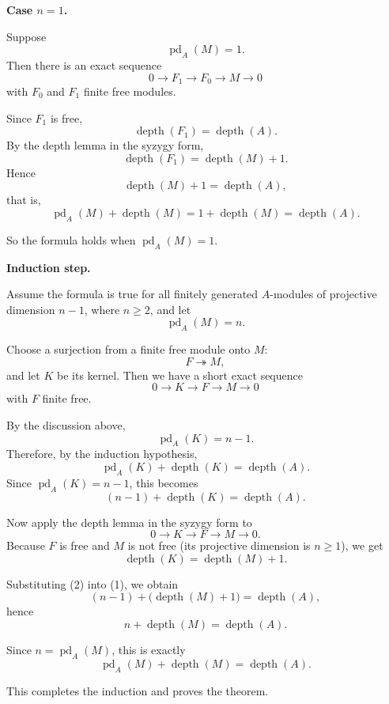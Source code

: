 \documentclass[12pt,a4paper]{article}
\theoremstyle{notespace}
\begin{document}
\medskip

\textbf{Case \(n=1\).}

Suppose
\[
\operatorname{pd}_A(M)=1.
\]
Then there is an exact sequence
\[
0 \longrightarrow F_1 \longrightarrow F_0 \longrightarrow M \longrightarrow 0
\]
with \(F_0\) and \(F_1\) finite free modules.

Since \(F_1\) is free,
\[
\operatorname{depth}(F_1)=\operatorname{depth}(A).
\]
By the depth lemma in the syzygy form,
\[
\operatorname{depth}(F_1)=\operatorname{depth}(M)+1.
\]
Hence
\[
\operatorname{depth}(M)+1=\operatorname{depth}(A),
\]
that is,
\[
\operatorname{pd}_A(M)+\operatorname{depth}(M)=1+\operatorname{depth}(M)=\operatorname{depth}(A).
\]

So the formula holds when \(\operatorname{pd}_A(M)=1\).

\medskip

\textbf{Induction step.}

Assume the formula is true for all finitely generated \(A\)-modules of projective dimension \(n-1\), where \(n\ge 2\), and let
\[
\operatorname{pd}_A(M)=n.
\]

Choose a surjection from a finite free module onto \(M\):
\[
F \twoheadrightarrow M,
\]
and let \(K\) be its kernel. Then we have a short exact sequence
\[
0 \longrightarrow K \longrightarrow F \longrightarrow M \longrightarrow 0
\]
with \(F\) finite free.

By the discussion above,
\[
\operatorname{pd}_A(K)=n-1.
\]
Therefore, by the induction hypothesis,
\[
\operatorname{pd}_A(K)+\operatorname{depth}(K)=\operatorname{depth}(A).
\]
Since \(\operatorname{pd}_A(K)=n-1\), this becomes
\[
(n-1)+\operatorname{depth}(K)=\operatorname{depth}(A).
\tag{1}
\]

Now apply the depth lemma in the syzygy form to
\[
0 \longrightarrow K \longrightarrow F \longrightarrow M \longrightarrow 0.
\]
Because \(F\) is free and \(M\) is not free (its projective dimension is \(n\ge 1\)), we get
\[
\operatorname{depth}(K)=\operatorname{depth}(M)+1.
\tag{2}
\]

Substituting (2) into (1), we obtain
\[
(n-1)+\bigl(\operatorname{depth}(M)+1\bigr)=\operatorname{depth}(A),
\]
hence
\[
n+\operatorname{depth}(M)=\operatorname{depth}(A).
\]

Since \(n=\operatorname{pd}_A(M)\), this is exactly
\[
\operatorname{pd}_A(M)+\operatorname{depth}(M)=\operatorname{depth}(A).
\]

This completes the induction and proves the theorem.
\end{document}
